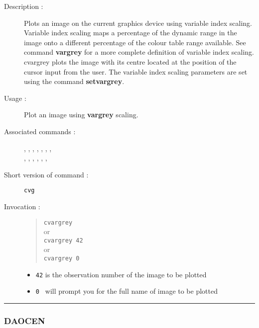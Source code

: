 \begin{description}

\item[Description :] Plots an image on the current graphics device
using variable index scaling.  Variable index scaling maps a percentage
of the dynamic range in the image onto a different percentage of the
colour table range available.  See command {\bf vargrey} for a more
complete definition of variable index scaling.  cvargrey plots the
image with its centre located at the position of the cursor input from
the user.  The variable index scaling parameters are set using the
command {\bf setvargrey}.

\item[Usage :] Plot an image using {\bf vargrey} scaling.

\item[Associated commands :] {\tt {}},
{\tt {}}, {\tt {}},
{\tt {}}, {\tt {}},
{\tt {}}, {\tt {}}, \\
{\tt {}}, {\tt {}},
{\tt {}}, {\tt {}},
{\tt {}}, {\tt {}},
{\tt {}}

\item[Short version of command :] {\tt cvg}
\item[Invocation :]

\begin{quote}{\tt  cvargrey }\\
or \\
{\tt cvargrey 42 }\\
or \\
{\tt cvargrey 0 }
\end{quote}

\begin{itemize}
\item {\tt 42} is the observation number of the image to be plotted
\item {\tt 0 } will prompt you for the full name of image to be plotted
\end{itemize}

\end{description}

\hrule
\subsubsection*{\label{DAOCEN}DAOCEN}

